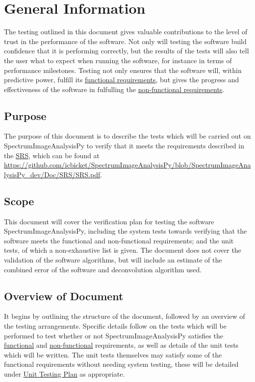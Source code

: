 \documentclass[12pt, titlepage]{article}
\newcommand{\progname}{SpectrumImageAnalysisPy}
\begin{document}
\section{General Information} The testing outlined in this document gives
valuable contributions to the level of trust in the performance of the software.
Not only will testing the software build confidence that it is performing
correctly, but the results of the tests will also tell the user what to expect
when running the software, for instance in terms of performance milestones.
Testing not only ensures that the software will, within predictive power,
fulfill its \hyperref[subsec:FR]{functional requirements}, but gives the
progress and effectiveness of the software in fulfulling the
\hyperref[subsec:NfR]{non-functional requirements}. 

\subsection{Purpose}
The purpose of this document is to describe the tests which will be carried out
on \progname{} to verify that it meets the requirements described in the
\hyperref[doc:SRS]{SRS}, which can be found at
\url{https://github.com/icbicket/SpectrumImageAnalysisPy/blob/SpectrumImageAnalysisPy_dev/Doc/SRS/SRS.pdf}.


\subsection{Scope}
This document will cover the verification plan for testing the software
\progname{}, including the system tests towards verifying that the software
meets the functional and non-functional requirements; and the unit tests, of
which a non-exhaustive list is given. The document does not cover the validation
of the software algorithms, but will include an estimate of the combined error
of the software and deconvolution algorithm used. 

\subsection{Overview of Document}
 It begins by outlining the structure of the document, followed by an overview
of the testing arrangements. Specific details follow on the tests which will be
performed to test whether or not \progname{} satisfies the
\hyperref[subsec:FuncReqTest]{functional} and
\hyperref[subsec:NonfuncReqTest]{non-functional} requirements, as well as
details of the unit tests which will be written. The unit tests themselves may
satisfy some of the functional requirements without needing system testing,
these will be detailed under \hyperref[sec:UnitTest]{Unit Testing Plan} as
appropriate.
\end{document}
